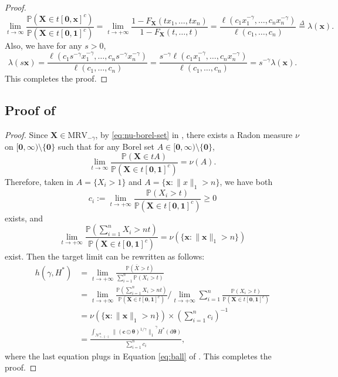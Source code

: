 \documentclass[12pt]{article}
\theoremstyle{plain}
\theoremstyle{plain}
\theoremstyle{definition}
\renewcommand{\Pr}{\mathbb{P}}
\newcommand{\punitsphere}[1]{\mathcal{N}_{+,\|\cdot\|}^{#1}}
\begin{document}
\begin{proof}
 \begin{equation*}
\lim_{t\to\infty}\frac{\Pr(\mathbf{X}\in t[\mathbf{0},\mathbf{x}]^c)}{\Pr(\mathbf{X}\in t[\mathbf{0},\mathbf{1}]^c)}=\lim_{t\to+\infty}\frac{1-F_{\mathbf{X}}(tx_1,\dots,tx_n)}{1-F_{\mathbf{X}}(t,\dots,t)} =\frac{\ell(c_1x_1^{-\gamma},\dots,c_nx_n ^{-\gamma})} {\ell(c_1,\dots,c_n)} \overset{\Delta}{=}\lambda(\mathbf{x}).
\end{equation*}
Also, we have for any $s>0$,
$$\lambda(s\mathbf{x})=\frac{\ell(c_1s^{-\gamma}x_1^{-\gamma},\dots,c_ns^{-\gamma}x_n ^{-\gamma})} {\ell(c_1,\dots,c_n)}= \frac{s^{-\gamma}\ell(c_1x_1^{-\gamma},\dots,c_nx_n ^{-\gamma})}{\ell(c_1,\dots,c_n)}= s^{-\gamma}\lambda(\mathbf{x}).$$
 This completes the proof.
\end{proof}



\subsection{Proof of }
\label{subsec:proof-sum-tail-general-norm}
\SumTailGeneralNorm*
\begin{proof} 


Since $\mathbf{X}\in\mathrm{MRV}_{-\gamma}$, by \eqref{eq:nu-borel-set} in , there exists a Radon measure $\nu$ on $[\mathbf{0},\bm{\infty})\setminus\{\mathbf{0}\}$ such that for any Borel set $A\in[\mathbf{0},\bm{\infty}) \setminus \{\mathbf{0}\}$,
\[
\lim_{t\to\infty}\frac{\Pr\left(\mathbf X\in tA\right)}{\Pr\left(\mathbf X\in t[\mathbf 0,\mathbf 1]^c\right)}
=\nu(A).
\]
Therefore, taken in $A=\{X_i>1\}$ and $A=\{\mathbf{x}: \|x\|_1>n\}$, we have both
\[
c_i := \lim_{t\to+\infty}\frac{\Pr(X_i>t)}{{\Pr\left(\mathbf X\in t[\mathbf 0,\mathbf 1]^c\right)}}\ge0
\]
exists, and
\[
\lim_{t\to+\infty}\frac{\Pr(\sum_{i=1}^n X_i > nt)}{{\Pr\left(\mathbf X\in t[\mathbf 0,\mathbf 1]^c\right)}}
=\nu\left(\{\mathbf{x}: \|\mathbf{x}\|_1>n\}\right)
\]
exist. 
Then the target limit can be rewritten as follows:
\begin{align*}
h(\gamma,H^*) &=\lim_{t\to+\infty}\frac{\Pr(\bar X>t)}{\sum_{i=1}^n\Pr(X_i>t)}\\
&=\lim_{t\to+\infty}\frac{\Pr(\sum_{i=1}^n X_i > nt)}{{\Pr\left(\mathbf X\in t[\mathbf 0,\mathbf 1]^c\right)}}\bigg/ \lim_{t\to+\infty}\sum_{i=1}^n\frac{\Pr(X_i>t)}{{\Pr\left(\mathbf X\in t[\mathbf 0,\mathbf 1]^c\right)}}\\
&  = \nu\left(\{\mathbf{x}: \|\mathbf{x}\|_1>n\}\right) \times \left( \sum_{i=1}^nc_i \right)^{-1}\\
&=\frac{\int_{\punitsphere{n}}{\|(\mathbf{c}\odot\bm{\theta})^{1/\gamma}\|_1}^\gamma H^*(\mathrm{d}\bm{\theta})}{\sum_{i=1}^nc_i},
\end{align*}
where the last equation plugs in Equation \eqref{eq:ball} of .
This completes the proof.


\end{proof}
\end{document}
